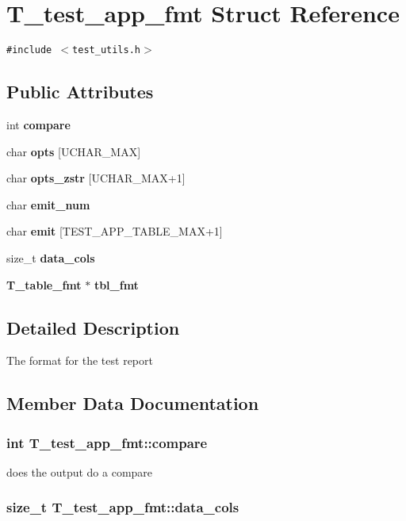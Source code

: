 \section{T\_\-test\_\-app\_\-fmt Struct Reference}
\label{structT__test__app__fmt}
{\tt \#include $<$test\_\-utils.h$>$}

\subsection*{Public Attributes}
\begin{CompactItemize}
\item 
int {\bf compare}
\item 
char {\bf opts} [UCHAR\_\-MAX]
\item 
char {\bf opts\_\-zstr} [UCHAR\_\-MAX+1]
\item 
char {\bf emit\_\-num}
\item 
char {\bf emit} [TEST\_\-APP\_\-TABLE\_\-MAX+1]
\item 
size\_\-t {\bf data\_\-cols}
\item 
{\bf T\_\-table\_\-fmt} $\ast$ {\bf tbl\_\-fmt}
\end{CompactItemize}


\subsection{Detailed Description}
The format for the test report 



\subsection{Member Data Documentation}
\subsubsection{\setlength{\rightskip}{0pt plus 5cm}int T\_\-test\_\-app\_\-fmt::compare}\label{structT__test__app__fmt_m0}


does the output do a compare 
\subsubsection{\setlength{\rightskip}{0pt plus 5cm}size\_\-t T\_\-test\_\-app\_\-fmt::data\_\-cols}\label{structT__test__app__fmt_m5}


